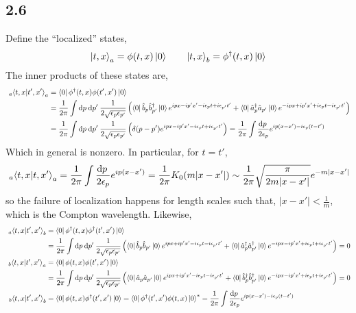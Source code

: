 \documentclass[12pt]{extarticle}
\begin{document}
\subsection*{2.6}
Define the ``localized'' states,
\[ \left| t, x \right>_a = \phi(t, x) \left| 0 \right> \quad \quad \left| t, x \right>_b = \phi^\dagger(t, x) \left| 0 \right> \]
The inner products of these states are,
\begin{align*}
~_a\!\left< t, x | t', x' \right>_a & = \left< 0 \right| \phi^\dagger(t, x) \phi(t', x') \left| 0 \right> 
\\
& = \frac{1}{2 \pi} \int \mathrm{d}p \: \mathrm{d}p' \: \frac{1}{2 \sqrt{\epsilon_p \epsilon_{p'}}} \left(\left< 0 \right| \hat{b}_p \hat{b}^\dagger_{p'} \left| 0 \right> e^{i p x - i p' x' - i \epsilon_{p} t + i \epsilon_{p'} t'} + \left< 0 \right| \hat{a}^\dagger_p \hat{a}_{p'} \left| 0 \right> e^{-i p x + i p' x' + i \epsilon_{p} t - i \epsilon_{p'} t'} \right)
\\
& = \frac{1}{2 \pi} \int \mathrm{d}p \: \mathrm{d}p' \: \frac{1}{2 \sqrt{\epsilon_p \epsilon_{p'}}} \left(\delta(p - p') e^{i p x - i p' x' - i \epsilon_{p} t + i \epsilon_{p'} t'} \right) = \frac{1}{2 \pi} \int \frac{\mathrm{d}p \:}{2 \epsilon_p} e^{i p (x - x') - i \epsilon_p (t - t')} 
\end{align*}
Which in general is nonzero. In particular, for $t = t'$,
\[ ~_a\!\left< t, x | t, x' \right>_a = \frac{1}{2 \pi} \int \frac{\mathrm{d}p \:}{2 \epsilon_p} e^{i p (x - x')} = \frac{1}{2\pi} K_0(m |x - x'|) \sim \frac{1}{2 \pi} \sqrt{\frac{\pi}{2 m |x - x'|}} e^{- m |x - x'|} \]
so the failure of localization happens for length scales such that, $|x - x'| < \frac{1}{m}$, which is the Compton wavelength. Likewise,
\begin{align*}
~_a\!\left< t, x | t', x' \right>_b & = \left< 0 \right| \phi^\dagger(t, x) \phi^\dagger(t', x') \left| 0 \right> 
\\
& = \frac{1}{2 \pi} \int \mathrm{d}p \: \mathrm{d}p' \: \frac{1}{2 \sqrt{\epsilon_p \epsilon_{p'}}} \left(\left< 0 \right| \hat{b}_p \hat{b}_{p'} \left| 0 \right> e^{i p x + i p' x' - i \epsilon_{p} t - i \epsilon_{p'} t'} + \left< 0 \right| \hat{a}^\dagger_p \hat{a}^\dagger_{p'} \left| 0 \right> e^{-i p x - i p' x' + i \epsilon_{p} t + i \epsilon_{p'} t'} \right) = 0
\\
~_b\!\left< t, x | t', x' \right>_a & = \left< 0 \right| \phi(t, x) \phi(t', x') \left| 0 \right> 
\\
& = \frac{1}{2 \pi} \int \mathrm{d}p \: \mathrm{d}p' \: \frac{1}{2 \sqrt{\epsilon_p \epsilon_{p'}}} \left(\left< 0 \right| \hat{a}_p \hat{a}_{p'} \left| 0 \right> e^{i p x + i p' x' - i \epsilon_{p} t - i \epsilon_{p'} t'} + \left< 0 \right| \hat{b}^\dagger_p \hat{b}^\dagger_{p'} \left| 0 \right> e^{-i p x - i p' x' + i \epsilon_{p} t + i \epsilon_{p'} t'} \right) = 0
\\
~_b\!\left< t, x | t', x' \right>_b & = \left< 0 \right| \phi(t, x) \phi^\dagger(t', x') \left| 0 \right> = \left< 0 \right| \phi^\dagger(t', x') \phi(t, x) \left| 0 \right>^* = \frac{1}{2 \pi} \int \frac{\mathrm{d}p \:}{2 \epsilon_p} e^{i p (x - x') - i \epsilon_p (t - t')}
\end{align*}
\end{document}
